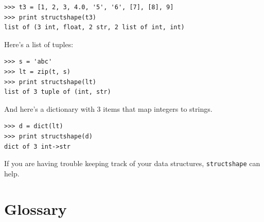 \documentclass[10pt]{book}
\begin{document}
\beforeverb
\begin{verbatim}
>>> t3 = [1, 2, 3, 4.0, '5', '6', [7], [8], 9]
>>> print structshape(t3)
list of (3 int, float, 2 str, 2 list of int, int)
\end{verbatim}
\afterverb
%
Here's a list of tuples:

\beforeverb
\begin{verbatim}
>>> s = 'abc'
>>> lt = zip(t, s)
>>> print structshape(lt)
list of 3 tuple of (int, str)
\end{verbatim}
\afterverb
%
And here's a dictionary with 3 items that map integers to strings.

\beforeverb
\begin{verbatim}
>>> d = dict(lt) 
>>> print structshape(d)
dict of 3 int->str
\end{verbatim}
\afterverb
%
If you are having trouble keeping track of your data structures,
{\tt structshape} can help.


\section{Glossary}
\end{document}
